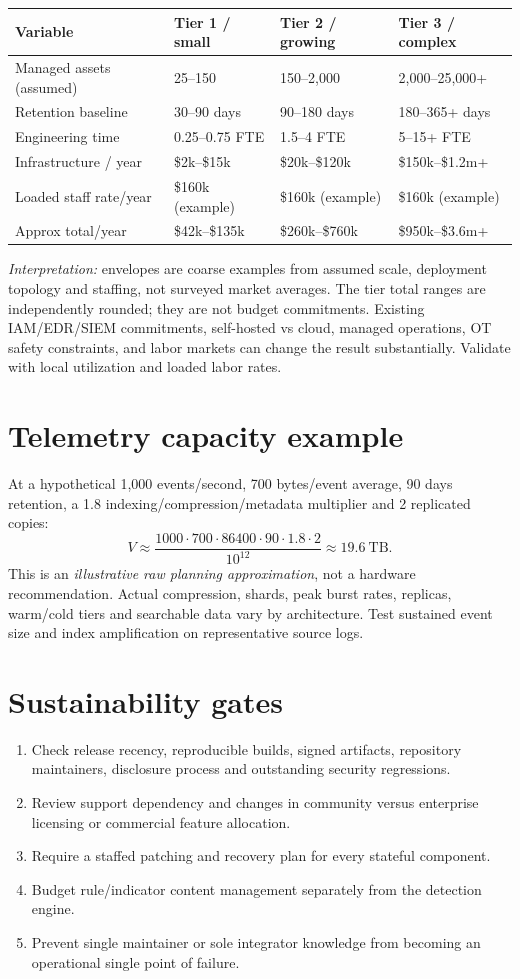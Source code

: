 \documentclass[11pt,oneside]{report}
\begin{document}
\noindent\begin{tabularx}{\textwidth}{P{0.19\textwidth}YYY}
\toprule Variable & Tier 1 / small & Tier 2 / growing & Tier 3 / complex\\\midrule
Managed assets (assumed) & 25--150 & 150--2,000 & 2,000--25,000+\\
Retention baseline & 30--90 days & 90--180 days & 180--365+ days\\
Engineering time & 0.25--0.75 FTE & 1.5--4 FTE & 5--15+ FTE\\
Infrastructure / year & \$2k--\$15k & \$20k--\$120k & \$150k--\$1.2m+\\
Loaded staff rate/year & \$160k (example) & \$160k (example) & \$160k (example)\\
Approx total/year & \$42k--\$135k & \$260k--\$760k & \$950k--\$3.6m+\\
\bottomrule
\end{tabularx}
\textit{Interpretation:} envelopes are coarse examples from assumed scale, deployment topology and staffing, not surveyed market averages. The tier total ranges are independently rounded; they are not budget commitments. Existing IAM/EDR/SIEM commitments, self-hosted vs cloud, managed operations, OT safety constraints, and labor markets can change the result substantially. Validate with local utilization and loaded labor rates.

\section{Telemetry capacity example}
At a hypothetical 1,000 events/second, 700 bytes/event average, 90 days retention, a 1.8 indexing/compression/metadata multiplier and 2 replicated copies:
\[
V \approx \frac{1000\cdot700\cdot86400\cdot90\cdot1.8\cdot2}{10^{12}}
\approx 19.6\ \text{TB}.
\]
This is an \emph{illustrative raw planning approximation}, not a hardware recommendation. Actual compression, shards, peak burst rates, replicas, warm/cold tiers and searchable data vary by architecture. Test sustained event size and index amplification on representative source logs.

\section{Sustainability gates}
\begin{enumerate}[leftmargin=1.6em]
\item Check release recency, reproducible builds, signed artifacts, repository maintainers, disclosure process and outstanding security regressions.
\item Review support dependency and changes in community versus enterprise licensing or commercial feature allocation.
\item Require a staffed patching and recovery plan for every stateful component.
\item Budget rule/indicator content management separately from the detection engine.
\item Prevent single maintainer or sole integrator knowledge from becoming an operational single point of failure.
\end{enumerate}
\end{document}
